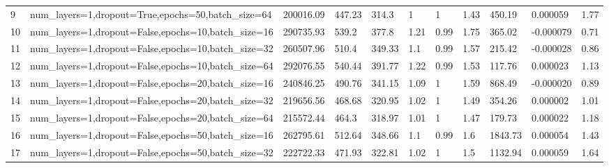 \begin{longtable}{C{0.8cm} L{2cm} C{1.15cm} C{1.15cm} C{1.15cm} C{1.15cm} C{0.85cm} C{1.25cm} C{1.2cm} C{1.5cm} C{1.0cm}}
9 & num\_layers=1,\newline dropout=True,\newline epochs=50,\newline batch\_size=64 & 200016.09 & 447.23 & 314.3 & 1 & 1 & 1.43 & 450.19 & 0.000059 & 1.77 \\
10 & num\_layers=1,\newline dropout=False,\newline epochs=10,\newline batch\_size=16 & 290735.93 & 539.2 & 377.8 & 1.21 & 0.99 & 1.75 & 365.02 & -0.000079 & 0.71 \\
11 & num\_layers=1,\newline dropout=False,\newline epochs=10,\newline batch\_size=32 & 260507.96 & 510.4 & 349.33 & 1.1 & 0.99 & 1.57 & 215.42 & -0.000028 & 0.86 \\
12 & num\_layers=1,\newline dropout=False,\newline epochs=10,\newline batch\_size=64 & 292076.55 & 540.44 & 391.77 & 1.22 & 0.99 & 1.53 & 117.76 & 0.000023 & 1.13 \\
13 & num\_layers=1,\newline dropout=False,\newline epochs=20,\newline batch\_size=16 & 240846.25 & 490.76 & 341.15 & 1.09 & 1 & 1.59 & 868.49 & -0.000020 & 0.89 \\
14 & num\_layers=1,\newline dropout=False,\newline epochs=20,\newline batch\_size=32 & 219656.56 & 468.68 & 320.95 & 1.02 & 1 & 1.49 & 354.26 & 0.000002 & 1.01 \\
15 & num\_layers=1,\newline dropout=False,\newline epochs=20,\newline batch\_size=64 & 215572.44 & 464.3 & 318.97 & 1.01 & 1 & 1.47 & 179.73 & 0.000022 & 1.18 \\
16 & num\_layers=1,\newline dropout=False,\newline epochs=50,\newline batch\_size=16 & 262795.61 & 512.64 & 348.66 & 1.1 & 0.99 & 1.6 & 1843.73 & 0.000054 & 1.43 \\
17 & num\_layers=1,\newline dropout=False,\newline epochs=50,\newline batch\_size=32 & 222722.33 & 471.93 & 322.81 & 1.02 & 1 & 1.5 & 1132.94 & 0.000059 & 1.64 \\

\end{longtable}
